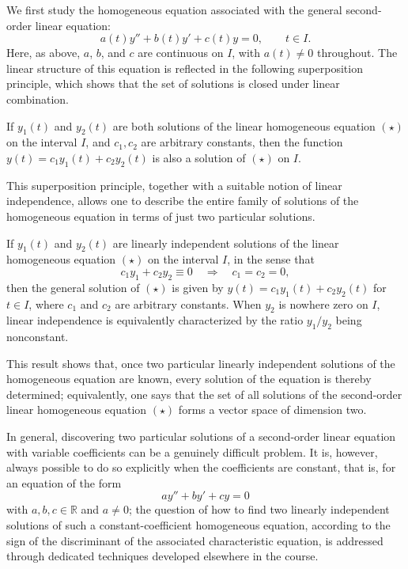 We first study the homogeneous equation associated with the general second-order linear equation:
\begin{equation*}
a(t) y'' + b(t) y' + c(t) y = 0, \qquad t \in I. \tag{$\star$}
\end{equation*}
Here, as above, $a$, $b$, and $c$ are continuous on $I$, with $a(t) \neq 0$ throughout. The linear structure of this equation is reflected in the following superposition principle, which shows that the set of solutions is closed under linear combination.

\begin{theorem}
If $y_1(t)$ and $y_2(t)$ are both solutions of the linear homogeneous equation $(\star)$ on the interval $I$, and $c_1, c_2$ are arbitrary constants, then the function $y(t) = c_1 y_1(t) + c_2 y_2(t)$ is also a solution of $(\star)$ on $I$.
\end{theorem}

This superposition principle, together with a suitable notion of linear independence, allows one to describe the entire family of solutions of the homogeneous equation in terms of just two particular solutions.

\begin{theorem}
If $y_1(t)$ and $y_2(t)$ are linearly independent solutions of the linear homogeneous equation $(\star)$ on the interval $I$, in the sense that
\[
c_1y_1+c_2y_2\equiv0 \quad\Longrightarrow\quad c_1=c_2=0,
\]
then the general solution of $(\star)$ is given by $y(t) = c_1 y_1(t) + c_2 y_2(t)$ for $t\in I$, where $c_1$ and $c_2$ are arbitrary constants. When $y_2$ is nowhere zero on $I$, linear independence is equivalently characterized by the ratio $y_1/y_2$ being nonconstant.
\end{theorem}

This result shows that, once two particular linearly independent solutions of the homogeneous equation are known, every solution of the equation is thereby determined; equivalently, one says that the set of all solutions of the second-order linear homogeneous equation $(\star)$ forms a vector space of dimension two.

In general, discovering two particular solutions of a second-order linear equation with variable coefficients can be a genuinely difficult problem. It is, however, always possible to do so explicitly when the coefficients are constant, that is, for an equation of the form
\[
a y'' + b y' + c y = 0
\]
 with $a, b, c \in \mathbb{R}$ and $a \neq 0$; the question of how to find two linearly independent solutions of such a constant-coefficient homogeneous equation, according to the sign of the discriminant of the associated characteristic equation, is addressed through dedicated techniques developed elsewhere in the course.

